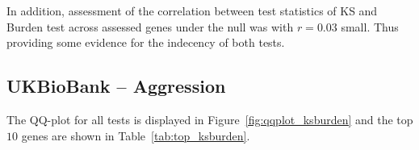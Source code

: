In addition, assessment of the correlation between test statistics of KS and Burden test across assessed genes under the null was with $r=0.03$ small.
Thus providing some evidence for the indecency of both tests. %

\subsection{UKBioBank -- Aggression}
\label{sub:ukbiobank_aggression}

The QQ-plot for all tests is displayed in Figure~\ref{fig:qqplot_ksburden} and the top $10$ genes are shown in Table~\ref{tab:top_ksburden}.
